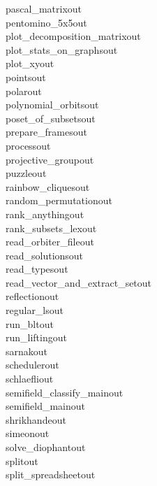 \begin{tabbing}
pascal\_matrixout\\[0pt]
pentomino\_5x5out\\[0pt]
plot\_decomposition\_matrixout\\[0pt]
plot\_stats\_on\_graphsout\\[0pt]
plot\_xyout\\[0pt]
pointsout\\[0pt]
polarout\\[0pt]
polynomial\_orbitsout\\[0pt]
poset\_of\_subsetsout\\[0pt]
prepare\_framesout\\[0pt]
processout\\[0pt]
projective\_groupout\\[0pt]
puzzleout\\[0pt]
rainbow\_cliquesout\\[0pt]
random\_permutationout\\[0pt]
rank\_anythingout\\[0pt]
rank\_subsets\_lexout\\[0pt]
read\_orbiter\_fileout\\[0pt]
read\_solutionsout\\[0pt]
read\_typesout\\[0pt]
read\_vector\_and\_extract\_setout\\[0pt]
reflectionout\\[0pt]
regular\_lsout\\[0pt]
run\_bltout\\[0pt]
run\_liftingout\\[0pt]
sarnakout\\[0pt]
schedulerout\\[0pt]
schlaefliout\\[0pt]
semifield\_classify\_mainout\\[0pt]
semifield\_mainout\\[0pt]
shrikhandeout\\[0pt]
simeonout\\[0pt]
solve\_diophantout\\[0pt]
splitout\\[0pt]
split\_spreadsheetout\\[0pt]

\end{tabbing}
